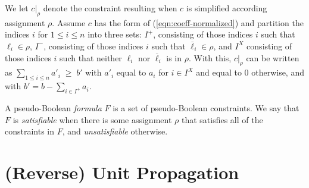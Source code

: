 \documentclass{easychair}
\renewcommand{\obar}[1]{\overline{#1}}
\newcommand{\lit}{\ell}
\newcommand{\assign}{\rho}
\newcommand{\simplify}[2]{#1|_{#2}}
\newcommand{\nassign}{\obar{\assign}}
\newcommand{\imply}{\Rightarrow}
\newcommand{\func}[1]{\llbracket#1\rrbracket}
\begin{document}


We let $\simplify{c}{\assign}$ denote the constraint resulting when $c$ is
simplified according assignment $\assign$.  Assume $c$ has the form of (\ref{eqn:coeff-normalized}) and
partition the indices $i$ for $1 \leq i \leq n$ into
three sets:
$I^{+}$, consisting of those indices $i$ such that $\lit_i \in \assign$,
$I^{-}$, consisting of those indices $i$ such that $\obar{\lit}_i \in \assign$,
and $I^{X}$ consisting of those indices $i$ such that neither $\lit_i$ nor $\obar{\lit}_i$ is in $\assign$.
With this, $\simplify{c}{\assign}$ can be written as $\sum_{1 \leq i \leq n} a'_i \; \geq \; b'$
with $a'_i$ equal to $a_i$ for $i \in I^{X}$ and equal to $0$ otherwise, and with $b' = b - \sum_{i\in I^{+}} a_i$.




A pseudo-Boolean {\em formula} $F$ is a set of pseudo-Boolean
constraints.  We say that $F$ is {\em satisfiable} when there is some
assignment $\assign$ that satisfies all of the constraints in $F$, and
{\em unsatisfiable} otherwise.  



\section{(Reverse) Unit Propagation}
\end{document}
